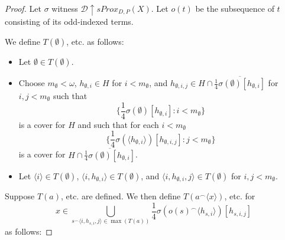\documentclass{amsart}
\theoremstyle{definition}
\theoremstyle{remark}
\newcommand{\<}{\langle}
\renewcommand{\>}{\rangle}
\newcommand{\cl}[1]{\overline{#1}}
\newcommand{\sproxgame}[1]{sProx_{D,P}(#1)}
\newcommand{\pl}[1]{\mathscr{#1}}
\newcommand{\win}{\uparrow}
\newcommand{\concat}{^\frown}
\begin{document}
\begin{proof}
  Let $\sigma$ witness $\pl D \win \sproxgame{X}$. Let $o(t)$ be the subsequence of $t$ consisting of its odd-indexed terms.

  We define $T(\emptyset)$, etc. as follows:

  \begin{itemize}
    \item Let $\emptyset\in T(\emptyset)$.
    \item Choose $m_\emptyset<\omega$, $h_{\emptyset,i}\in H$ for $i<m_\emptyset$, and $h_{\emptyset,i,j}\in H\cap\cl{\frac{1}{4}\sigma(\emptyset)[h_{\emptyset,i}]}$ for $i,j<m_\emptyset$ such that
      \[
        \{\frac{1}{4}\sigma(\emptyset)[h_{\emptyset,i}]:i<m_\emptyset\}
      \]
    is a cover for $H$ and such that for each $i<m_\emptyset$
      \[
        \{\frac{1}{4}\sigma(\<h_{\emptyset,i}\>)[h_{\emptyset,i,j}]:j<m_\emptyset\}
      \]
    is a cover for $H\cap\cl{\frac{1}{4}\sigma(\emptyset)[h_{\emptyset,i}]}$.
    \item Let $\<i\>\in T(\emptyset)$, $\<i,h_{\emptyset,i}\>\in T(\emptyset)$, and $\<i,h_{\emptyset,i},j\>\in T(\emptyset)$ for $i,j<m_\emptyset$.
  \end{itemize}

  Suppose $T(a)$, etc. are defined. We then define $T(a\concat\<x\>)$, etc. for
    \[
      x\in \bigcup_{s\concat\<i,h_{s,i},j\>\in\max(T(a))} \frac{1}{4}\sigma(o(s)\concat\<h_{s,i}\>)[h_{s,i,j}]
    \]
  as follows:


\end{proof}
\end{document}

